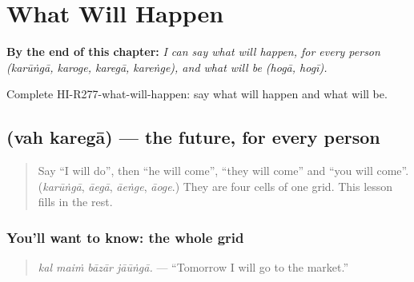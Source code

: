
\chapter{What Will Happen}
\label{ch:hi-what-will-happen}

\begin{chapteropening}
\textbf{By the end of this chapter:} \emph{I can say what will happen, for every person (karūṅgā, karoge, karegā, kareṅge), and what will be (hogā, hogī).}

Complete HI-R277-what-will-happen: say what will happen and what will be.
\end{chapteropening}

\section[\texorpdfstring{\hi{वह} \hi{करेगा} (vah karegā)}{वह करेगा (vah karegā)}]{  (vah karegā) — the future, for every person}

\label{lesson:HI-C277-vahkarega}



\begin{quote}
Say \textquotedblleft{}I will do\textquotedblright{}, then \textquotedblleft{}he will come\textquotedblright{}, \textquotedblleft{}they will come\textquotedblright{} and \textquotedblleft{}you will come\textquotedblright{}. (\emph{karūṅgā}, \emph{āegā}, \emph{āeṅge}, \emph{āoge}.) They are four cells of one grid. This lesson fills in the rest.
\end{quote}

\subsection*{You'll want to know: the whole grid}
\begin{quote}
\textbf{   }
\end{quote}

\begin{quote}
\emph{kal maiṁ bāzār jāūṅgā.} — \textquotedblleft{}Tomorrow I will go to the market.\textquotedblright{}
\end{quote}

